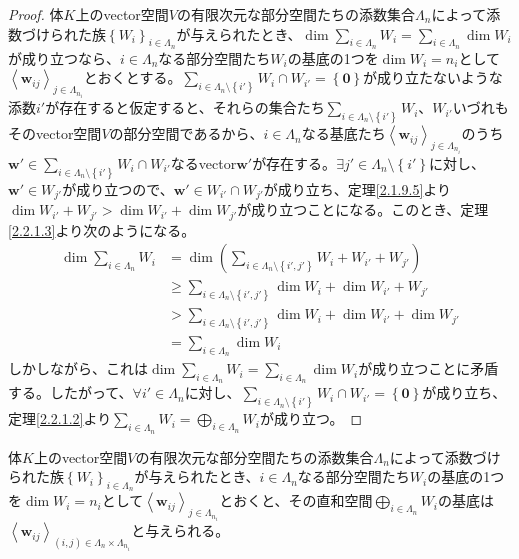 \documentclass[dvipdfmx]{jsarticle}
\begin{document}
\begin{proof}
体$K$上のvector空間$V$の有限次元な部分空間たちの添数集合$\varLambda_{n}$によって添数づけられた族$\left\{ W_{i} \right\}_{i \in \varLambda_{n}}$が与えられたとき、$\dim{\sum_{i \in \varLambda_{n}} W_{i}} = \sum_{i \in \varLambda_{n}} {\dim W_{i}}$が成り立つなら、$i \in \varLambda_{n}$なる部分空間たち$W_{i}$の基底の1つを$\dim W_{i} = n_{i}$として$\left\langle \mathbf{w}_{ij} \right\rangle_{j \in \varLambda_{n_{i}}}$とおくとする。$\sum_{i \in \varLambda_{n} \setminus \left\{ i' \right\}} W_{i} \cap W_{i'} = \left\{ \mathbf{0} \right\}$が成り立たないような添数$i'$が存在すると仮定すると、それらの集合たち$\sum_{i \in \varLambda_{n} \setminus \left\{ i' \right\}} W_{i}$、$W_{i'}$いづれもそのvector空間$V$の部分空間であるから、$i \in \varLambda_{n}$なる基底たち$\left\langle \mathbf{w}_{ij} \right\rangle_{j \in \varLambda_{n_{i}}}$のうち$\mathbf{w}' \in \sum_{i \in \varLambda_{n} \setminus \left\{ i' \right\}} W_{i} \cap W_{i'}$なるvector$\mathbf{w}'$が存在する。$\exists j' \in \varLambda_{n} \setminus \left\{ i' \right\}$に対し、$\mathbf{w}' \in W_{j'}$が成り立つので、$\mathbf{w}' \in W_{i'} \cap W_{j'}$が成り立ち、定理\ref{2.1.9.5}より$\dim{W_{i'} + W_{j'}} > \dim W_{i'} + \dim W_{j'}$が成り立つことになる。このとき、定理\ref{2.2.1.3}より次のようになる。
\begin{align*}
\dim{\sum_{i \in \varLambda_{n}} W_{i}} &= \dim\left( \sum_{i \in \varLambda_{n} \setminus \left\{ i',j' \right\}} W_{i} + W_{i'} + W_{j'} \right)\\
&\geq \sum_{i \in \varLambda_{n} \setminus \left\{ i',j' \right\}} {\dim W_{i}} + \dim{W_{i'} + W_{j'}}\\
&> \sum_{i \in \varLambda_{n} \setminus \left\{ i',j' \right\}} {\dim W_{i}} + \dim W_{i'} + \dim W_{j'}\\
&= \sum_{i \in \varLambda_{n}} {\dim W_{i}}
\end{align*}
しかしながら、これは$\dim{\sum_{i \in \varLambda_{n}} W_{i}} = \sum_{i \in \varLambda_{n}} {\dim W_{i}}$が成り立つことに矛盾する。したがって、$\forall i' \in \varLambda_{n}$に対し、$\sum_{i \in \varLambda_{n} \setminus \left\{ i' \right\}} W_{i} \cap W_{i'} = \left\{ \mathbf{0} \right\}$が成り立ち、定理\ref{2.2.1.2}より$\sum_{i \in \varLambda_{n}} W_{i} = \bigoplus_{i \in \varLambda_{n}} W_{i}$が成り立つ。
\end{proof}
\begin{thm}\label{2.2.1.5}
体$K$上のvector空間$V$の有限次元な部分空間たちの添数集合$\varLambda_{n}$によって添数づけられた族$\left\{ W_{i} \right\}_{i \in \varLambda_{n}}$が与えられたとき、$i \in \varLambda_{n}$なる部分空間たち$W_{i}$の基底の1つを$\dim W_{i} = n_{i}$として$\left\langle \mathbf{w}_{ij} \right\rangle_{j \in \varLambda_{n_{i}}}$とおくと、その直和空間$\bigoplus_{i \in \varLambda_{n}} W_{i}$の基底は$\left\langle \mathbf{w}_{ij} \right\rangle_{(i,j) \in \varLambda_{n} \times \varLambda_{n_{i}}}$と与えられる。
\end{thm}
\end{document}

